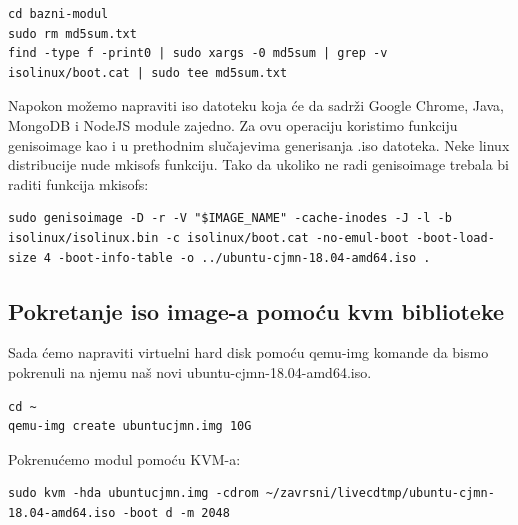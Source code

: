 \documentclass[12pt,vi]{mitthesis}
\begin{document}
\begin{lstlisting}[style=BashInputStyle]
cd bazni-modul
sudo rm md5sum.txt
find -type f -print0 | sudo xargs -0 md5sum | grep -v isolinux/boot.cat | sudo tee md5sum.txt
\end{lstlisting}

\noindent
Napokon možemo napraviti iso datoteku koja će da sadrži Google Chrome, Java, MongoDB i NodeJS module zajedno. Za ovu operaciju koristimo funkciju genisoimage kao i u prethodnim slučajevima generisanja .iso datoteka. Neke linux distribucije nude mkisofs funkciju. Tako da ukoliko ne radi genisoimage trebala bi raditi funkcija mkisofs:
\begin{lstlisting}[style=BashInputStyle]
sudo genisoimage -D -r -V "$IMAGE_NAME" -cache-inodes -J -l -b isolinux/isolinux.bin -c isolinux/boot.cat -no-emul-boot -boot-load-size 4 -boot-info-table -o ../ubuntu-cjmn-18.04-amd64.iso .
\end{lstlisting}

\subsection*{Pokretanje iso image-a pomoću kvm biblioteke}
\indent
Sada ćemo napraviti virtuelni hard disk pomoću qemu-img komande da bismo pokrenuli na njemu naš novi ubuntu-cjmn-18.04-amd64.iso.
\begin{lstlisting}[style=BashInputStyle]
cd ~
qemu-img create ubuntucjmn.img 10G
\end{lstlisting}

\noindent 
Pokrenućemo modul pomoću KVM-a:
\begin{lstlisting}[style=BashInputStyle]
sudo kvm -hda ubuntucjmn.img -cdrom ~/zavrsni/livecdtmp/ubuntu-cjmn-18.04-amd64.iso -boot d -m 2048
\end{lstlisting}
\end{document}
